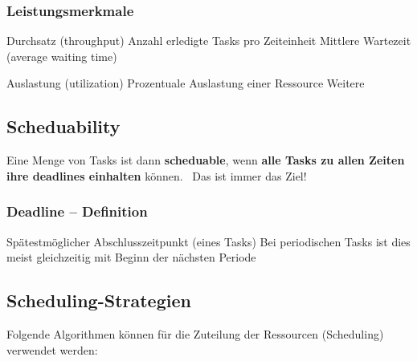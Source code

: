 \subsubsection{Leistungsmerkmale}

\begin{minipage}[t]{0.52\columnwidth}
    \raggedright

    \begin{outline}
        \1 Durchsatz (throughput)
            \2 Anzahl erledigte Tasks pro Zeiteinheit
        \1 Mittlere Wartezeit (average waiting time)
    \end{outline}
\end{minipage}
\hfill
\begin{minipage}[t]{0.45\columnwidth}
    \raggedright

    \begin{outline}
        \1 Auslastung (utilization)
            \2 Prozentuale Auslastung einer Ressource
        \1 Weitere
    \end{outline}
\end{minipage}


\subsection{Scheduability}

Eine Menge von Tasks ist dann \textbf{scheduable}, wenn \textbf{alle Tasks zu allen Zeiten ihre deadlines einhalten} können. 
\textrightarrow\ Das ist immer das Ziel!

\subsubsection{Deadline -- Definition}

\begin{outline}
    \1 Spätestmöglicher Abschlusszeitpunkt (eines Tasks)
        \2 Bei periodischen Tasks ist dies meist gleichzeitig mit Beginn der nächsten Periode
\end{outline}


\subsection{Scheduling-Strategien}
\label{Scheduling-Strategien}

Folgende Algorithmen können für die Zuteilung der Ressourcen (Scheduling) verwendet werden:

\vspace{0.1cm}

